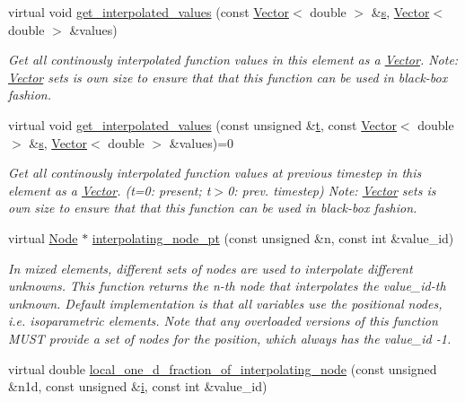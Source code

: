 \begin{DoxyCompactItemize}
virtual void \hyperlink{classoomph_1_1RefineableElement_ad9a4f92880668a2373326d8306365c43}{get\+\_\+interpolated\+\_\+values} (const \hyperlink{classoomph_1_1Vector}{Vector}$<$ double $>$ \&\hyperlink{cfortran_8h_ab7123126e4885ef647dd9c6e3807a21c}{s}, \hyperlink{classoomph_1_1Vector}{Vector}$<$ double $>$ \&values)
\begin{DoxyCompactList}\small\item\em Get all continously interpolated function values in this element as a \hyperlink{classoomph_1_1Vector}{Vector}. Note\+: \hyperlink{classoomph_1_1Vector}{Vector} sets is own size to ensure that that this function can be used in black-\/box fashion. \end{DoxyCompactList}\item 
virtual void \hyperlink{classoomph_1_1RefineableElement_ada6f0efe831ffefb1d2829ce01d45bfc}{get\+\_\+interpolated\+\_\+values} (const unsigned \&\hyperlink{cfortran_8h_af6f0bd3dc13317f895c91323c25c2b8f}{t}, const \hyperlink{classoomph_1_1Vector}{Vector}$<$ double $>$ \&\hyperlink{cfortran_8h_ab7123126e4885ef647dd9c6e3807a21c}{s}, \hyperlink{classoomph_1_1Vector}{Vector}$<$ double $>$ \&values)=0
\begin{DoxyCompactList}\small\item\em Get all continously interpolated function values at previous timestep in this element as a \hyperlink{classoomph_1_1Vector}{Vector}. (t=0\+: present; t$>$0\+: prev. timestep) Note\+: \hyperlink{classoomph_1_1Vector}{Vector} sets is own size to ensure that that this function can be used in black-\/box fashion. \end{DoxyCompactList}\item 
virtual \hyperlink{classoomph_1_1Node}{Node} $\ast$ \hyperlink{classoomph_1_1RefineableElement_ab27986fc2f6033a4758662cde78a7b76}{interpolating\+\_\+node\+\_\+pt} (const unsigned \&n, const int \&value\+\_\+id)
\begin{DoxyCompactList}\small\item\em In mixed elements, different sets of nodes are used to interpolate different unknowns. This function returns the n-\/th node that interpolates the value\+\_\+id-\/th unknown. Default implementation is that all variables use the positional nodes, i.\+e. isoparametric elements. Note that any overloaded versions of this function M\+U\+ST provide a set of nodes for the position, which always has the value\+\_\+id -\/1. \end{DoxyCompactList}\item 
virtual double \hyperlink{classoomph_1_1RefineableElement_ac4e4ae5374154855ae9b072c6269f76e}{local\+\_\+one\+\_\+d\+\_\+fraction\+\_\+of\+\_\+interpolating\+\_\+node} (const unsigned \&n1d, const unsigned \&\hyperlink{cfortran_8h_adb50e893b86b3e55e751a42eab3cba82}{i}, const int \&value\+\_\+id)

\end{DoxyCompactItemize}
